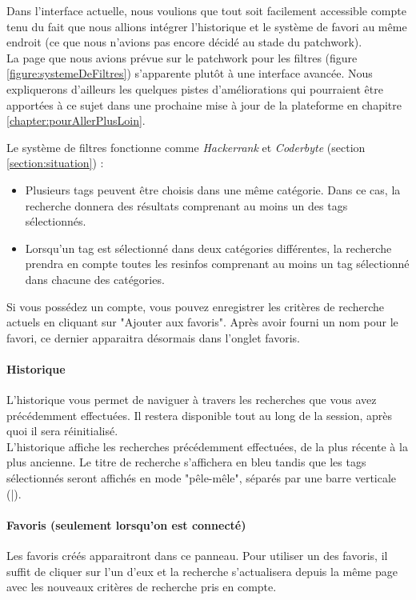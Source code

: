 Dans l'interface actuelle, nous voulions que tout soit facilement accessible compte tenu du fait que nous allions intégrer l'historique et le système de favori au même endroit (ce que nous n'avions pas encore décidé au stade du patchwork).\\

La page que nous avions prévue sur le patchwork pour les filtres (figure \ref{figure:systemeDeFiltres}) s'apparente plutôt à une interface avancée. Nous expliquerons d'ailleurs les quelques pistes d'améliorations qui pourraient être apportées à ce sujet dans une prochaine mise à jour de la plateforme en chapitre \ref{chapter:pourAllerPlusLoin}.

Le système de filtres fonctionne comme \textit{Hackerrank} et \textit{Coderbyte} (section \ref{section:situation}) :

\begin{itemize}
    \item Plusieurs \glspl{tag} peuvent être choisis dans une même catégorie. Dans ce cas, la recherche donnera des résultats comprenant au moins un des \glspl{tag} sélectionnés.
    \item Lorsqu'un \gls{tag} est sélectionné dans deux catégories différentes, la recherche prendra en compte toutes les \glspl{resinfo} comprenant au moins un \gls{tag} sélectionné dans chacune des catégories.
\end{itemize}

Si vous possédez un compte, vous pouvez enregistrer les critères de recherche actuels en cliquant sur "Ajouter aux favoris". Après avoir fourni un nom pour le favori, ce dernier apparaitra désormais dans l'onglet favoris.\\

\paragraph{Historique} L'historique vous permet de naviguer à travers les recherches que vous avez précédemment effectuées. Il restera disponible tout au long de la session, après quoi il sera réinitialisé.\\

L'historique affiche les recherches précédemment effectuées, de la plus récente à la plus ancienne. Le titre de recherche s'affichera en bleu tandis que les \glspl{tag} sélectionnés seront affichés en mode "pêle-mêle", séparés par une barre verticale (|).\\

\paragraph{Favoris (seulement lorsqu'on est connecté)} Les favoris créés apparaitront dans ce panneau. Pour utiliser un des favoris, il suffit de cliquer sur l'un d'eux et la recherche s'actualisera depuis la même page avec les nouveaux critères de recherche pris en compte.


